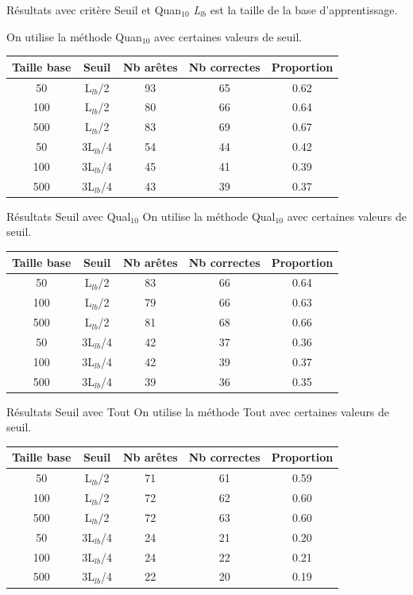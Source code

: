 \documentclass{beamer}
\begin{document}
\begin{frame}{Résultats avec critère Seuil et Quan$_{10}$}
\emph{L$_{lb}$} est la taille de la base d'apprentissage. 


On utilise la méthode Quan$_{10}$ avec certaines valeurs de seuil.

\begin{tabular}{|c|c|c|c|c|}
   \hline
   Taille base & Seuil & Nb arêtes & Nb correctes & Proportion\\
   \hline
   50 & L$_{lb}$/2 & 93 & 65 & 0.62  \\   
   \hline
   100 & L$_{lb}$/2 & 80 & 66 & 0.64  \\
   \hline
   500 & L$_{lb}$/2 & 83 & 69 & 0.67  \\
   \hline
   \hline
   50 & 3L$_{lb}$/4 & 54 & 44 & 0.42  \\
   \hline
   100 & 3L$_{lb}$/4 & 45 & 41 & 0.39  \\
   \hline
   500 & 3L$_{lb}$/4 & 43 & 39 & 0.37  \\
   \hline
\end{tabular}


\end{frame}

\begin{frame}{Résultats Seuil avec Qual$_{10}$}
On utilise la méthode Qual$_{10}$ avec certaines valeurs de seuil.
\begin{tabular}{|c|c|c|c|c|}
   \hline
   Taille base & Seuil & Nb arêtes & Nb correctes & Proportion\\
    \hline
   50 & L$_{lb}$/2 & 83 & 66 & 0.64  \\
   \hline
   100 & L$_{lb}$/2 & 79 & 66 & 0.63  \\
   \hline
   500 & L$_{lb}$/2 & 81 & 68 & 0.66  \\
   \hline
   \hline
   50 & 3L$_{lb}$/4 & 42 & 37 & 0.36  \\
   \hline
   100 & 3L$_{lb}$/4 & 42 & 39 & 0.37  \\
   \hline
   500 & 3L$_{lb}$/4 & 39 & 36 & 0.35  \\
   \hline
\end{tabular}
\end{frame}

\begin{frame}{Résultats Seuil avec Tout}
On utilise la méthode Tout avec certaines valeurs de seuil.
\begin{tabular}{|c|c|c|c|c|}
   \hline
   Taille base & Seuil & Nb arêtes & Nb correctes & Proportion\\
   \hline
   50 & L$_{lb}$/2 & 71 & 61 & 0.59  \\
   \hline
   100 & L$_{lb}$/2 & 72 & 62 & 0.60  \\
   \hline
   500 & L$_{lb}$/2 & 72 & 63 & 0.60  \\
   \hline
   \hline
   50 & 3L$_{lb}$/4 & 24 & 21 & 0.20  \\
   \hline
   100 & 3L$_{lb}$/4 & 24 & 22 & 0.21  \\
   \hline
   500 & 3L$_{lb}$/4 & 22 & 20 & 0.19  \\
   \hline
\end{tabular}
\end{frame}
\end{document}
